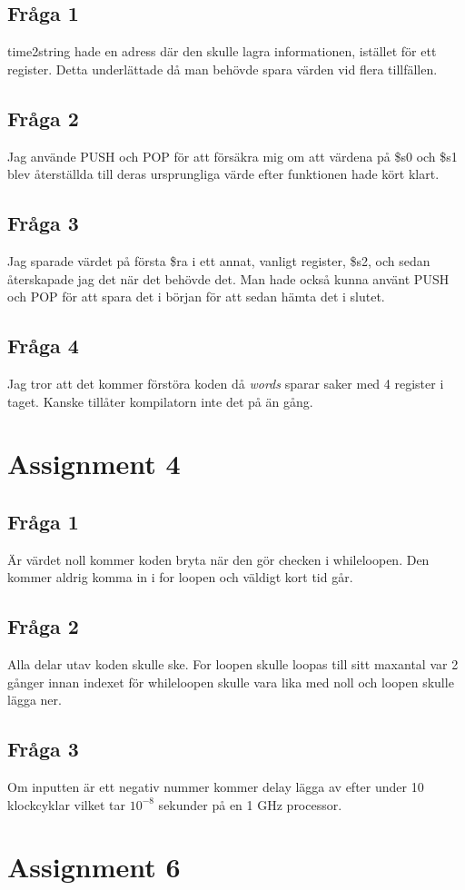 \documentclass[a4paper,11p]{article}
\begin{document}
\subsection{Fråga 1}
time2string hade en adress där den skulle lagra informationen, istället för ett register. Detta underlättade då man behövde spara värden vid flera tillfällen. 
\subsection{Fråga 2}
Jag använde PUSH och POP för att försäkra mig om att värdena på \$s0 och \$s1 blev återställda till deras ursprungliga värde efter funktionen hade kört klart.
\subsection{Fråga 3}
Jag sparade värdet på första \$ra i ett annat, vanligt register, \$s2, och sedan återskapade jag det när det behövde det. Man hade också kunna använt PUSH och POP för att spara det i början för att sedan hämta det i slutet.
\subsection{Fråga 4}
Jag tror att det kommer förstöra koden då \emph{words} sparar saker med 4 register i taget. Kanske tillåter kompilatorn inte det på än gång. 
\section{Assignment 4}
\subsection{Fråga 1}
Är värdet noll kommer koden bryta när den gör checken i whileloopen. Den kommer aldrig komma in i for loopen och väldigt kort tid går.
\subsection{Fråga 2}
Alla delar utav koden skulle ske. For loopen skulle loopas till sitt maxantal var 2 gånger innan indexet för whileloopen skulle vara lika med noll och loopen skulle lägga ner.
\subsection{Fråga 3}
Om inputten är ett negativ nummer kommer delay lägga av efter under 10 klockcyklar vilket tar $10^{-8}$ sekunder på en 1 GHz processor.
\section{Assignment 6}
\end{document}
